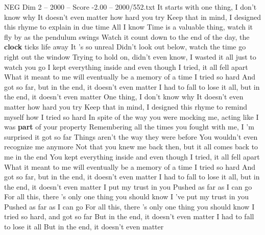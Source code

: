 \begin{textsample}{NEG Dim 2 – 2000 – Score -2.00 – 2000/552.txt}  \label{ex:f2_neg_038}
It starts with one thing, I don't know why It doesn't even matter how hard you try Keep that in mind, I designed this rhyme to explain in due time All I know Time is a valuable thing, watch it fly by as the pendulum swings Watch it count down to the end of the day, the \textbf{clock} ticks life away It 's so unreal Didn't look out below, watch the time go right out the window Trying to hold on, didn't even know, I wasted it all just to watch you go I kept everything inside and even though I tried, it all fell apart What it meant to me will eventually be a memory of a time I tried so hard And got so far, but in the end, it doesn't even matter I had to fall to lose it all, but in the end, it doesn't even matter One thing, I don't know why It doesn't even matter how hard you try Keep that in mind, I designed this rhyme to remind myself how I tried so hard In spite of the way you were mocking me, acting like I was \textbf{part} of your property Remembering all the times you fought with me, I 'm surprised it got so far Things aren't the way they were before You wouldn't even recognize me anymore Not that you knew me back then, but it all comes back to me in the end You kept everything inside and even though I tried, it all fell apart What it meant to me will eventually be a memory of a time I tried so hard And got so far, but in the end, it doesn't even matter I had to fall to lose it all, but in the end, it doesn't even matter I put my trust in you Pushed as far as I can go For all this, there 's only one thing you should know I 've put my trust in you Pushed as far as I can go For all this, there 's only one thing you should know I tried so hard, and got so far But in the end, it doesn't even matter I had to fall to lose it all But in the end, it doesn't even matter

\end{textsample}
